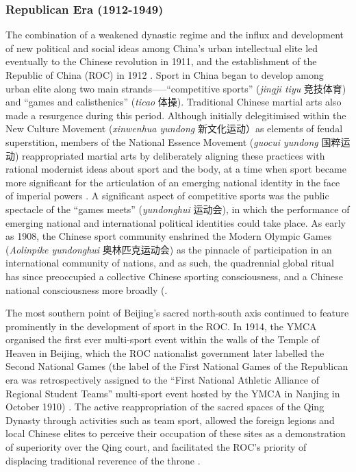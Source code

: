 \begin{CJK}{UTF8}{gbsn}
\subsubsection{Republican Era (1912-1949)}
The combination of a weakened dynastic regime and the influx and development of new political and social ideas among China's urban intellectual elite led eventually to the Chinese revolution in 1911, and the establishment of the Republic of China (ROC) in 1912 \citep{Mitter2008}. Sport in China began to develop among urban elite along two main strands—--``competitive sports'' (\textit{jingji tiyu} 竞技体育) and ``games and calisthenics'' (\textit{ticao} 体操).  Traditional Chinese martial arts also made a resurgence during this period.  Although initially delegitimised within the New Culture Movement (\textit{xinwenhua yundong} 新文化运动）as elements of feudal superstition, members of the National Essence Movement (\textit{guocui yundong} 国粹运动) reappropriated martial arts by deliberately aligning these practices with rational modernist ideas about sport and the body, at a time when sport became more significant for the articulation of an emerging national identity in the face of imperial powers \citep[38]{Brownell1995}\citep[45]{Morris2004}.  A significant aspect of competitive sports was the public spectacle of the ``games meets'' (\textit{yundonghui} 运动会), in which the performance of emerging national and international political identities could take place.  As early as 1908, the Chinese sport community enshrined the Modern Olympic Games (\textit{Aolinpike yundonghui} 奥林匹克运动会) as the pinnacle of participation in an international community of nations, and as such, the quadrennial global ritual has since preoccupied a collective Chinese sporting consciousness, and a Chinese national consciousness more broadly (\citep{Burnett2009;Barme2009;Brownell2008;Morris2004;Xu2008}.

The most southern point of Beijing's sacred north-south axis continued to feature prominently in the development of sport in the ROC.  In 1914, the YMCA organised the first ever multi-sport event within the walls of the Temple of Heaven in Beijing, which the ROC nationalist government later labelled the Second National Games (the label of the First National Games of the Republican era was retrospectively assigned to the ``First National Athletic Alliance of Regional Student Teams'' multi-sport event hosted by the YMCA in Nanjing in October 1910) \citep[441]{Li2015}. The active reappropriation of the sacred spaces of the Qing Dynasty through activities such as team sport, allowed the foreign legions and local Chinese elites to perceive their occupation of these sites as a demonstration of superiority over the Qing court, and facilitated the ROC's priority of displacing traditional reverence of the throne \citep{Hevia1990}.


\end{CJK}
